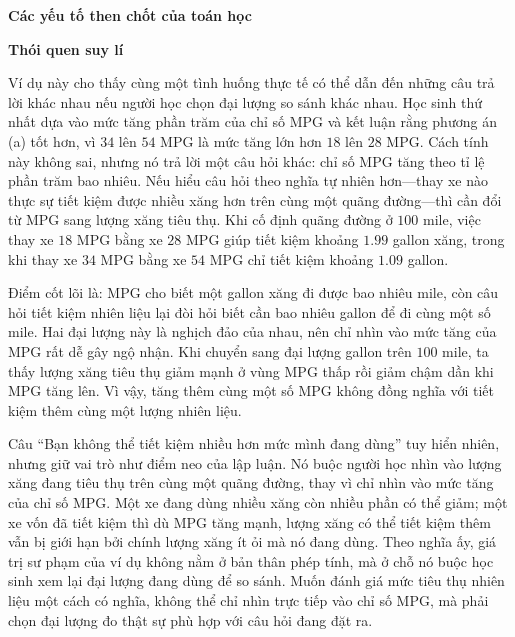 {    \textbf{Các yếu tố then chốt của toán học}

    \begin{hanglist}
      \vspace{\baselineskip}

    \end{hanglist}

    \textbf{Thói quen suy lí}

    \begin{hanglist}

    \end{hanglist}
  }
  {
    \vspace{.5\baselineskip}
    Ví dụ này cho thấy cùng một tình huống thực tế có thể dẫn đến những câu trả lời khác nhau nếu người học chọn đại lượng so sánh khác nhau. Học sinh thứ nhất dựa vào mức tăng phần trăm của chỉ số MPG và kết luận rằng phương án (a) tốt hơn, vì $34$ lên $54$ MPG là mức tăng lớn hơn $18$ lên $28$ MPG. Cách tính này không sai, nhưng nó trả lời một câu hỏi khác: chỉ số MPG tăng theo tỉ lệ phần trăm bao nhiêu. Nếu hiểu câu hỏi theo nghĩa tự nhiên hơn---thay xe nào thực sự tiết kiệm được nhiều xăng hơn trên cùng một quãng đường---thì cần đổi từ MPG sang lượng xăng tiêu thụ. Khi cố định quãng đường ở $100$ mile, việc thay xe $18$ MPG bằng xe $28$ MPG giúp tiết kiệm khoảng $1.99$ gallon xăng, trong khi thay xe $34$ MPG bằng xe $54$ MPG chỉ tiết kiệm khoảng $1.09$ gallon.

    Điểm cốt lõi là: MPG cho biết một gallon xăng đi được bao nhiêu mile, còn câu hỏi tiết kiệm nhiên liệu lại đòi hỏi biết cần bao nhiêu gallon để đi cùng một số mile. Hai đại lượng này là nghịch đảo của nhau, nên chỉ nhìn vào mức tăng của MPG rất dễ gây ngộ nhận. Khi chuyển sang đại lượng gallon trên $100$ mile, ta thấy lượng xăng tiêu thụ giảm mạnh ở vùng MPG thấp rồi giảm chậm dần khi MPG tăng lên. Vì vậy, tăng thêm cùng một số MPG không đồng nghĩa với tiết kiệm thêm cùng một lượng nhiên liệu.

    Câu ``Bạn không thể tiết kiệm nhiều hơn mức mình đang dùng'' tuy hiển nhiên, nhưng giữ vai trò như điểm neo của lập luận. Nó buộc người học nhìn vào lượng xăng đang tiêu thụ trên cùng một quãng đường, thay vì chỉ nhìn vào mức tăng của chỉ số MPG. Một xe đang dùng nhiều xăng còn nhiều phần có thể giảm; một xe vốn đã tiết kiệm thì dù MPG tăng mạnh, lượng xăng có thể tiết kiệm thêm vẫn bị giới hạn bởi chính lượng xăng ít ỏi mà nó đang dùng. Theo nghĩa ấy, giá trị sư phạm của ví dụ không nằm ở bản thân phép tính, mà ở chỗ nó buộc học sinh xem lại đại lượng đang dùng để so sánh. Muốn đánh giá mức tiêu thụ nhiên liệu một cách có nghĩa, không thể chỉ nhìn trực tiếp vào chỉ số MPG, mà phải chọn đại lượng đo thật sự phù hợp với câu hỏi đang đặt ra.
  }

